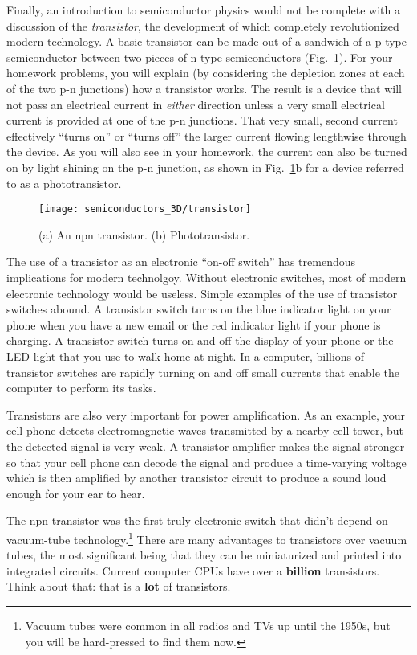 Finally, an introduction to semiconductor physics would not be complete
with a discussion of the {\it transistor}, the development of
which completely revolutionized modern technology. A basic transistor
can be made out of a sandwich of a p-type semiconductor between two pieces
of n-type semiconductors (Fig.~\ref{fig:transistor}). For your homework
problems, you will explain (by considering the depletion zones at
each of the two p-n junctions) how a transistor works. The result is
a device that will not pass an electrical current in {\it either} 
direction unless a very small electrical current is provided at
one of the p-n junctions. That very small, second current effectively
``turns on'' or ``turns off'' the larger current flowing lengthwise
through the device. As you will also see in your homework, the
current can also be turned on by light shining on the p-n junction,
as shown in Fig.~\ref{fig:transistor}b for a device referred to
as a phototransistor.

\begin{figure}
\begin{center}
\texttt{[image: semiconductors\_3D/transistor]}
\end{center} 
\caption{(a) An npn transistor. (b) Phototransistor.
} 
\label{fig:transistor} 
\end{figure}

The use of a transistor as an electronic ``on-off switch'' has
tremendous implications for modern technolgoy. Without electronic 
switches, most of modern electronic technology would be useless.
Simple examples of the use of transistor switches abound. 
A transistor switch turns on the blue indicator light on your
phone when you have a new email or the red indicator light if
your phone is charging. A transistor switch turns on and off
the display of your phone or the LED light that you use to
walk home at night. In a computer, billions of transistor switches
are rapidly turning on and off small currents that enable
the computer to perform its tasks.

Transistors are also very important for power amplification. As an example,
your cell phone detects electromagnetic waves transmitted by a nearby
cell tower, but the detected signal is very weak. A transistor amplifier
makes the signal stronger so that your cell phone can decode the signal
and produce a time-varying voltage which is then amplified by another
transistor circuit to produce a sound loud enough for your ear to hear.

The npn transistor was the first truly electronic switch that didn't depend
on vacuum-tube technology.\footnote{Vacuum tubes were common in all
radios and TVs up until the 1950s, but you will be hard-pressed to find
them now.} There are many advantages to transistors over vacuum tubes, the
most significant being that they can be miniaturized and printed into
integrated circuits. Current computer CPUs have over a {\bf billion}
transistors.  Think about that: that is a {\bf lot} of transistors.

